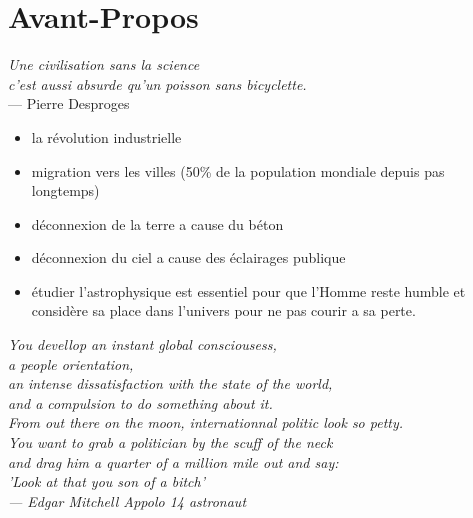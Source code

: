 
\chapter*{Avant-Propos}

\begin{flushright}{\slshape    
	Une civilisation sans la science \\
	c'est aussi absurde qu'un poisson sans bicyclette.} \\ \medskip 
	--- Pierre Desproges
\end{flushright}

\begin{itemize}
\item la révolution industrielle
\item migration vers les villes (50\% de la population mondiale depuis pas longtemps)
\item déconnexion de la terre a cause du béton
\item déconnexion du ciel a cause des éclairages publique
\item étudier l'astrophysique est essentiel pour que l'Homme reste humble et considère sa place dans l'univers pour ne pas courir a sa perte.
\end{itemize}

\begin{flushright}{\slshape    
	You devellop an instant global consciousess, \\
	a people orientation,\\
	an intense dissatisfaction with the state of the world,\\
	and a compulsion to do something about it.\\
	From out there on the moon, internationnal politic look so petty. \\
	You want to grab a politician by the scuff of the neck\\
	and drag him a quarter of a million mile out and say: \\
	'Look at that you son of a bitch'\\ \medskip 
	--- Edgar Mitchell Appolo 14 astronaut }
\end{flushright}